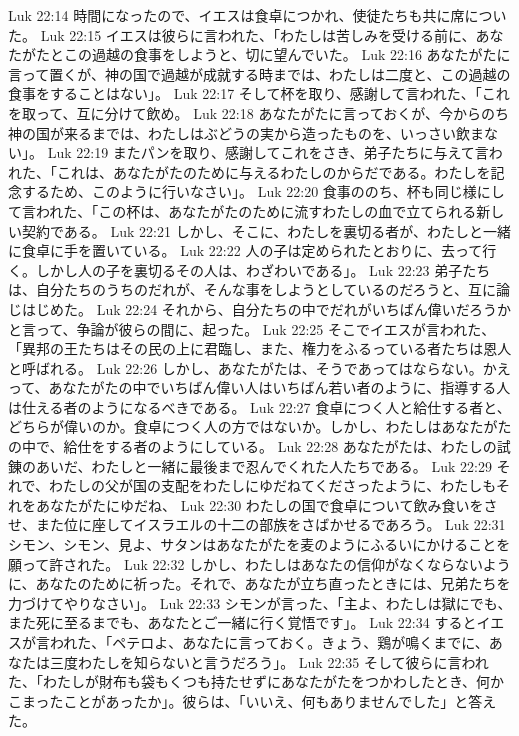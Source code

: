 Luk 22:14  時間になったので、イエスは食卓につかれ、使徒たちも共に席についた。
Luk 22:15  イエスは彼らに言われた、「わたしは苦しみを受ける前に、あなたがたとこの過越の食事をしようと、切に望んでいた。
Luk 22:16  あなたがたに言って置くが、神の国で過越が成就する時までは、わたしは二度と、この過越の食事をすることはない」。
Luk 22:17  そして杯を取り、感謝して言われた、「これを取って、互に分けて飲め。
Luk 22:18  あなたがたに言っておくが、今からのち神の国が来るまでは、わたしはぶどうの実から造ったものを、いっさい飲まない」。
Luk 22:19  またパンを取り、感謝してこれをさき、弟子たちに与えて言われた、「これは、あなたがたのために与えるわたしのからだである。わたしを記念するため、このように行いなさい」。
Luk 22:20  食事ののち、杯も同じ様にして言われた、「この杯は、あなたがたのために流すわたしの血で立てられる新しい契約である。
Luk 22:21  しかし、そこに、わたしを裏切る者が、わたしと一緒に食卓に手を置いている。
Luk 22:22  人の子は定められたとおりに、去って行く。しかし人の子を裏切るその人は、わざわいである」。
Luk 22:23  弟子たちは、自分たちのうちのだれが、そんな事をしようとしているのだろうと、互に論じはじめた。
Luk 22:24  それから、自分たちの中でだれがいちばん偉いだろうかと言って、争論が彼らの間に、起った。
Luk 22:25  そこでイエスが言われた、「異邦の王たちはその民の上に君臨し、また、権力をふるっている者たちは恩人と呼ばれる。
Luk 22:26  しかし、あなたがたは、そうであってはならない。かえって、あなたがたの中でいちばん偉い人はいちばん若い者のように、指導する人は仕える者のようになるべきである。
Luk 22:27  食卓につく人と給仕する者と、どちらが偉いのか。食卓につく人の方ではないか。しかし、わたしはあなたがたの中で、給仕をする者のようにしている。
Luk 22:28  あなたがたは、わたしの試錬のあいだ、わたしと一緒に最後まで忍んでくれた人たちである。
Luk 22:29  それで、わたしの父が国の支配をわたしにゆだねてくださったように、わたしもそれをあなたがたにゆだね、
Luk 22:30  わたしの国で食卓について飲み食いをさせ、また位に座してイスラエルの十二の部族をさばかせるであろう。
Luk 22:31  シモン、シモン、見よ、サタンはあなたがたを麦のようにふるいにかけることを願って許された。
Luk 22:32  しかし、わたしはあなたの信仰がなくならないように、あなたのために祈った。それで、あなたが立ち直ったときには、兄弟たちを力づけてやりなさい」。
Luk 22:33  シモンが言った、「主よ、わたしは獄にでも、また死に至るまでも、あなたとご一緒に行く覚悟です」。
Luk 22:34  するとイエスが言われた、「ペテロよ、あなたに言っておく。きょう、鶏が鳴くまでに、あなたは三度わたしを知らないと言うだろう」。
Luk 22:35  そして彼らに言われた、「わたしが財布も袋もくつも持たせずにあなたがたをつかわしたとき、何かこまったことがあったか」。彼らは、「いいえ、何もありませんでした」と答えた。
